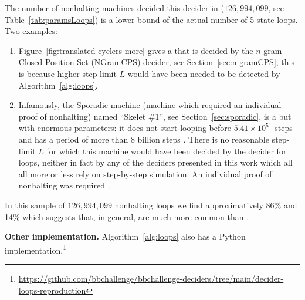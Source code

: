 The number of nonhalting machines decided this decider in \CoqBB (\ie $126{,}994{,}099$, see Table~\ref{tab:paramsLoops}) is a lower bound of the actual number of 5-state loops. Two examples:

\begin{enumerate}
  \item Figure~\ref{fig:translated-cyclers-more} gives a \TC that is decided by the $n$-gram Closed Position Set (NGramCPS) decider, see Section~\ref{sec:n-gramCPS}, this is because higher step-limit $L$ would have been needed to be detected by Algorithm~\ref{alg:loops}.
  \item Infamously, the Sporadic machine (\ie machine which required an individual proof of nonhalting) named ``Skelet \#1'', see Section~\ref{sec:sporadic}, is a \TC but with enormous parameters: it does not start looping before $5.41 \times 10^{51}$ steps and has a period of more than 8 billion steps \cite{ShawnSkelet1}. There is no reasonable step-limit $L$ for which this machine would have been decided by the decider for loops, neither in fact by any of the deciders presented in this work which all all more or less rely on step-by-step simulation. An individual proof of nonhalting was required \cite{busycoq}.
\end{enumerate}

In this sample of $126{,}994{,}099$ nonhalting loops we find approximatively 86\% \TCs and 14\% \cyclers which suggests that, in general, \TCs are much more common than \cyclers.

\textbf{Other implementation.} Algorithm~\ref{alg:loops} also has a Python implementation.\footnote{\url{https://github.com/bbchallenge/bbchallenge-deciders/tree/main/decider-loops-reproduction}}